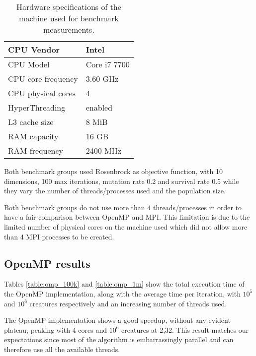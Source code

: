 \documentclass[12pt,a4paper,oneside]{article}
\begin{document}
	\begin{table}[!ht]
		\centering
		\begin{tabular}{|l|l|}
			\hline
			CPU Vendor         & Intel        \\ \hline
			CPU Model          & Core i7 7700 \\ \hline
			CPU core frequency & 3.60 GHz     \\ \hline
			CPU physical cores & 4            \\ \hline
			HyperThreading     & enabled      \\ \hline
			L3 cache size      & 8 MiB        \\ \hline
			RAM capacity       & 16 GB        \\ \hline
			RAM frequency      & 2400 MHz     \\ \hline
		\end{tabular}
		\caption{Hardware specifications of the machine used for benchmark measurements.}
		\label{hw-specs}
	\end{table}

	Both benchmark groups used Rosenbrock as objective function, with 10 dimensions, 100 max iterations, mutation rate 0.2 and survival rate 0.5 while they vary the number of threads/processes used and the population size.

	Both benchmark groups do not use more than 4 threads/processes in order to have a fair comparison between OpenMP and MPI.
	This limitation is due to the limited number of physical cores on the machine used which did not allow more than 4 MPI processes to be created.

	\subsection{OpenMP results}
	Tables \ref{table:omp_100k} and \ref{table:omp_1m} show the total execution time of the OpenMP implementation, along with the average time per iteration, with $10^5$ and $10^6$ creatures respectively and an increasing number of threads used.

	The OpenMP implementation shows a good speedup, without any evident plateau, peaking with 4 cores and $10^6$ creatures at 2,32.
	This result matches our expectations since most of the algorithm is embarrassingly parallel and can therefore use all the available threads.
\end{document}
